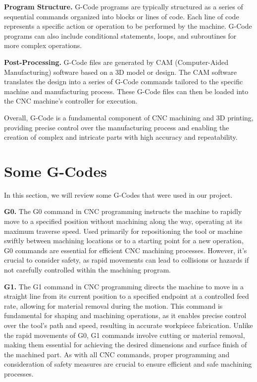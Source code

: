 \noindent\textbf{Program Structure.}
G-Code programs are typically structured as a series of sequential commands organized into blocks or lines of code.
Each line of code represents a specific action or operation to be performed by the machine.
G-Code programs can also include conditional statements, loops, and subroutines for more complex operations.

\noindent\textbf{Post-Processing.}
G-Code files are generated by CAM (Computer-Aided Manufacturing) software based on a 3D model or design.
The CAM software translates the design into a series of G-Code commands tailored to the specific machine and manufacturing process.
These G-Code files can then be loaded into the CNC machine's controller for execution.

Overall, G-Code is a fundamental component of CNC machining and 3D printing,
providing precise control over the manufacturing process
and enabling the creation of complex and intricate parts with high accuracy and repeatability.

\section{Some G-Codes}
In this section, we will review some G-Codes that were used in our project.

\noindent\textbf{G0.}
The G0 command in CNC programming instructs the machine to rapidly move to a specified position
without machining along the way, operating at its maximum traverse speed.
Used primarily for repositioning the tool or machine swiftly between machining locations
or to a starting point for a new operation, G0 commands are essential for efficient CNC machining processes.
However, it's crucial to consider safety, as rapid movements can lead to collisions
or hazards if not carefully controlled within the machining program.

\noindent\textbf{G1.}
The G1 command in CNC programming directs the machine to move in a straight line from its current position to a specified endpoint at a controlled feed rate, allowing for material removal during the motion. This command is fundamental for shaping and machining operations, as it enables precise control over the tool's path and speed, resulting in accurate workpiece fabrication. Unlike the rapid movements of G0, G1 commands involve cutting or material removal, making them essential for achieving the desired dimensions and surface finish of the machined part. As with all CNC commands, proper programming and consideration of safety measures are crucial to ensure efficient and safe machining processes.

